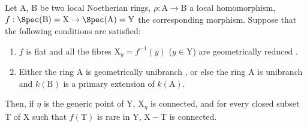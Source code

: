 \begin{theorem}[18.9.7]
\label{IV.18.9.7}
Let $\mathrm{A}$, $\mathrm{B}$ be two local Noetherian rings, $\rho:\mathrm{A}\to\mathrm{B}$ a local homomorphism, $f:\Spec(\mathrm{B})=\mathrm{X}\to\Spec(\mathrm{A})=\mathrm{Y}$ the corresponding morphism.
Suppose that the following conditions are satisfied:
\begin{enumerate}[label=\emph{\roman*)}]
  \item $f$ is flat and all the fibres $\mathrm{X}_y=f^{-1}(y)$ ($y\in\mathrm{Y}$) are geometrically reduced .
  \item Either the ring $\mathrm{A}$ is geometrically unibranch , or else the ring A is unibranch  and $k(\mathrm{B})$ is a primary extension  of $k(\mathrm{A})$.
\end{enumerate}
Then, if $\eta$ is the generic point of $\mathrm{Y}$, $\mathrm{X}_\eta$ is connected, and for every closed subset $\mathrm{T}$ of X such that $f(\mathrm{T})$ is rare in Y, $\mathrm{X}-\mathrm{T}$ is connected.
\end{theorem}

